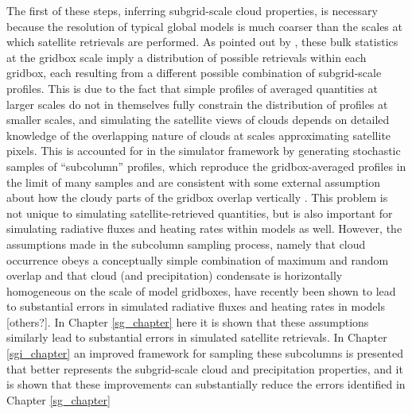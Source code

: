 The first of these steps, inferring subgrid-scale cloud properties, is necessary because the resolution of typical global models is much coarser than the scales at which satellite retrievals are performed. As pointed out by \cite{pincus_et_al_2012}, these bulk statistics at the gridbox scale imply a distribution of possible retrievals within each gridbox, each resulting from a different possible combination of subgrid-scale profiles. This is due to the fact that simple profiles of averaged quantities at larger scales do not in themselves fully constrain the distribution of profiles at smaller scales, and simulating the satellite views of clouds depends on detailed knowledge of the overlapping nature of clouds at scales approximating satellite pixels. This is accounted for in the simulator framework by generating stochastic samples of ``subcolumn'' profiles, which reproduce the gridbox-averaged profiles in the limit of many samples and are consistent with some external assumption about how the cloudy parts of the gridbox overlap vertically \citep{klein_and_jakob_1999}. This problem is not unique to simulating satellite-retrieved quantities, but is also important for simulating radiative fluxes and heating rates within models as well. However, the assumptions made in the subcolumn sampling process, namely that cloud occurrence obeys a conceptually simple combination of maximum and random overlap and that cloud (and precipitation) condensate is horizontally homogeneous on the scale of model gridboxes, have recently been shown to lead to substantial errors in simulated radiative fluxes and heating rates in models \citep{barker_et_al_1999, oreopoulos_et_al_2012} [others?]. In Chapter \ref{sg_chapter} here it is shown that these assumptions similarly lead to substantial errors in simulated satellite retrievals. In Chapter \ref{sgi_chapter} an improved framework for sampling these subcolumns is presented that better represents the subgrid-scale cloud and precipitation properties, and it is shown that these improvements can substantially reduce the errors identified in Chapter \ref{sg_chapter}

